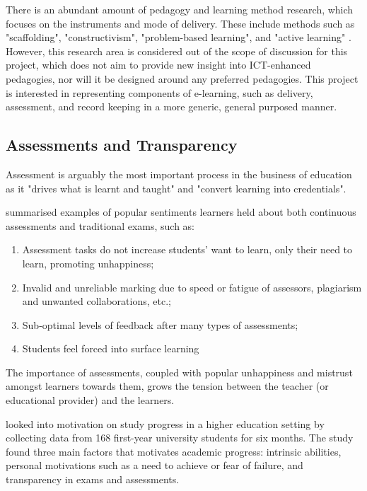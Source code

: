 There is an abundant amount of pedagogy and learning method research, which focuses on the 
instruments and mode of delivery. These include methods such as "scaffolding", "constructivism", 
"problem-based learning", and "active learning" \citep{ali2005effective}. However, this 
research area is considered out of the scope of discussion for this project, which does not 
aim to provide new insight into ICT-enhanced pedagogies, nor will it be designed around any 
preferred pedagogies. This project is interested in representing components of e-learning, 
such as delivery, assessment, and record keeping in a more generic, general purposed manner.

\subsection{Assessments and Transparency}

Assessment is arguably the most important process in the business of education as it "drives what 
is learnt and taught" and "convert learning into credentials". \citep[p.160]{campbell2010digital}

\citet{brown1999assessment} summarised examples of popular sentiments learners held about both 
continuous assessments and traditional exams, such as:

\begin{enumerate}
    \item Assessment tasks do not increase students' want to learn, only their need to learn, promoting unhappiness;
    \item Invalid and unreliable marking due to speed or fatigue of assessors, plagiarism and unwanted collaborations, etc.;
    \item Sub-optimal levels of feedback after many types of assessments;
    \item Students feel forced into surface learning
    \citep[p.62-65]{brown1999assessment}
\end{enumerate}

The importance of assessments, coupled with popular unhappiness and mistrust amongst learners towards 
them, grows the tension between the teacher (or educational provider) and the learners.

\citet{suhre2013determinants} looked into motivation on study progress in a higher education setting by collecting data 
from 168 first-year university students for six months. The study found three main factors that motivates academic 
progress: intrinsic abilities, personal motivations such as a need to achieve or fear of failure, and transparency in 
exams and assessments.

